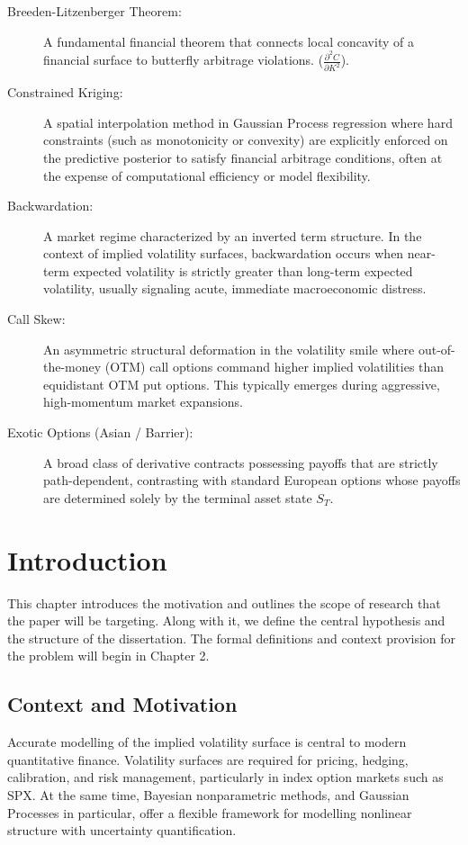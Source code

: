 \documentclass[12pt,oneside]{report}
\theoremstyle{definition}
\theoremstyle{remark}
\begin{document}
\begin{description}
    \item[Breeden-Litzenberger Theorem:] A fundamental financial theorem that connects local concavity of a financial surface to butterfly arbitrage violations. 
     ($\frac{\partial^2 C}{\partial K^2}$).
     \item[Constrained Kriging:] A spatial interpolation method in Gaussian Process regression where hard constraints (such as monotonicity or convexity) are explicitly enforced on the predictive posterior to satisfy financial arbitrage conditions, often at the expense of computational efficiency or model flexibility.
     \item[Backwardation:] A market regime characterized by an inverted term structure. In the context of implied volatility surfaces, backwardation occurs when near-term expected volatility is strictly greater than long-term expected volatility, usually signaling acute, immediate macroeconomic distress.
     \item[Call Skew:] An asymmetric structural deformation in the volatility smile where out-of-the-money (OTM) call options command higher implied volatilities than equidistant OTM put options. This typically emerges during aggressive, high-momentum market expansions.
     \item[Exotic Options (Asian / Barrier):] A broad class of derivative contracts possessing payoffs that are strictly path-dependent, contrasting with standard European options whose payoffs are determined solely by the terminal asset state $S_T$.
\end{description}

\newpage

\chapter{Introduction}
This chapter introduces the motivation and outlines the scope of research that the paper will be targeting. Along with it, we define the central hypothesis and the structure of the dissertation. The formal definitions and context provision for the problem will begin in Chapter 2.


\section{Context and Motivation}
Accurate modelling of the implied volatility surface is central to modern quantitative finance. Volatility surfaces are required for pricing, hedging, calibration, and risk management, particularly in index option markets such as SPX. At the same time, Bayesian nonparametric methods, and Gaussian Processes in particular, offer a flexible framework for modelling nonlinear structure with uncertainty quantification.
\end{document}
